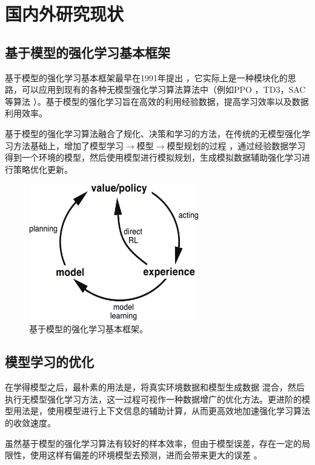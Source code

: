 \section{国内外研究现状}


\subsection{基于模型的强化学习基本框架}

基于模型的强化学习基本框架最早在1991年提出 \cite{Sutton1991DynaReacting}，它实际上是一种模块化的思路，可以应用到现有的各种无模型强化学习算法算法中（例如PPO ，TD3，SAC等算法 \cite{schulman2017proximal,haarnoja2018soft}）。基于模型的强化学习旨在高效的利用经验数据，提高学习效率以及数据利用效率。

基于模型的强化学习算法融合了规化、决策和学习的方法，在传统的无模型强化学习方法基础上，增加了模型学习$\longrightarrow$模型$\longrightarrow$模型规划的过程 \cite{lin1992self}，通过经验数据学习得到一个环境的模型，然后使用模型进行模拟规划，生成模拟数据辅助强化学习进行策略优化更新。

\begin{figure}[tbh]
\centering
\includegraphics[width=0.66\textwidth]{figures/Dyna.png}
\caption{基于模型的强化学习基本框架。}
\label{fig:dyna-structure}
\end{figure}

\subsection{模型学习的优化}

在学得模型之后，最朴素的用法是，将真实环境数据和模型生成数据 混合，然后执行无模型强化学习方法，这一过程可视作一种数据增广的优化方法。更进阶的模型用法是，使用模型进行上下文信息的辅助计算，从而更高效地加速强化学习算法的收敛速度。

虽然基于模型的强化学习算法有较好的样本效率，但由于模型误差，存在一定的局限性，使用这样有偏差的环境模型去预测，进而会带来更大的误差 \cite{zambaldi2018deep}。

